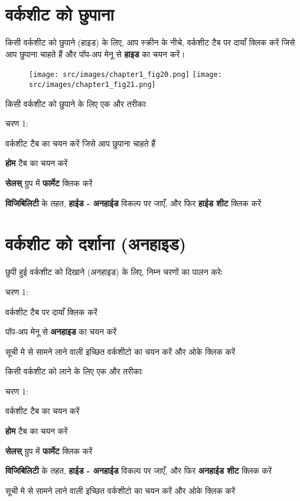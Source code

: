 \section{वर्कशीट को छुपाना}\label{id-1.11}

किसी वर्कशीट को छुपाने (हाइड) के लिए, आप स्क्रीन के नीचे, वर्कशीट टैब पर दायाँ क्लिक करें जिसे आप छुपाना चाहते हैं और पॉप-अप मेनू से \textbf{हाइड} का चयन करें।

\begin{figure}[H]
\centering
\texttt{[image: src/images/chapter1\_fig20.png]}\qquad
\texttt{[image: src/images/chapter1\_fig21.png]}
\end{figure}

किसी वर्कशीट को छुपाने के लिए एक और तरीकाः		
\begin{descriptionSimple}{चरण 1:}
\item[चरण 1] वर्कशीट टैब का चयन करें जिसे आप छुपाना चाहते हैं
\item[चरण 2] \textbf{होम} टैब का चयन करें
\item[चरण 3] \textbf{सेलस्} ग्रुप में \textbf{फार्मेट} क्लिक करें
\item[चरण 4] \textbf{विजिबिलिटी} के तहत, \textbf{हाईड - अनहाईड} विकल्प पर जाएँ, और फिर \textbf{हाईड शीट} क्लिक करें
\end{descriptionSimple}
	
\section{वर्कशीट को दर्शाना (अनहाइड)}\label{id-1.12}

छुपी हुई वर्कशीट को दिखाने (अनहाइड) के लिए, निम्न चरणों का पालन करेः
\begin{descriptionSimple}{चरण 1:}
\item[चरण 1] वर्कशीट टैब पर दायाँ क्लिक करें
\item[चरण 2] पॉप-अप मेनू से \textbf{अनहाइड} का चयन करें
\item[चरण 3] सूची मे से सामने लाने वाली इच्छित वर्कशीटो का चयन करें और ओके क्लिक करें
\end{descriptionSimple}					

किसी वर्कशीट को लाने के लिए एक और तरीकाः
\begin{descriptionSimple}{चरण 1:}
\item[चरण 1] वर्कशीट टैब का चयन करें
\item[चरण 2] \textbf{होम} टैब का चयन करें
\item[चरण 3] \textbf{सेलस्} ग्रुप में \textbf{फार्मेट} क्लिक करें
\item[चरण 4] \textbf{विजिबिलिटी} के तहत, \textbf{हाईड - अनहाईड} विकल्प पर जाएँ, और फिर \textbf{अनहाईड शीट} क्लिक करें
\item[चरण 5] सूची मे से सामने लाने वाली इच्छित वर्कशीटो का चयन करें और ओके क्लिक करें
\end{descriptionSimple}
\newpage

